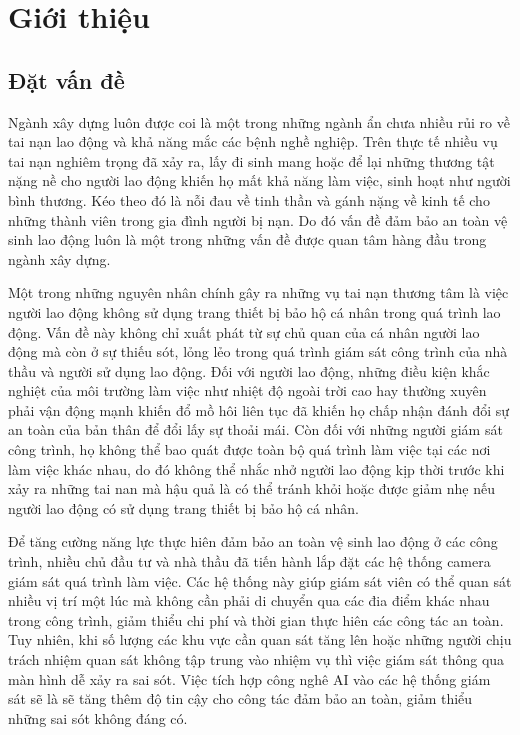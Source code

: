 \chapter{Giới thiệu}
\setcounter{page}{1}
\section{Đặt vấn đề}
Ngành xây dựng luôn được coi là một trong những ngành ẩn chưa nhiều rủi ro về tai nạn lao động 
và khả năng mắc các bệnh nghề nghiệp. Trên thực tế nhiều vụ tai nạn nghiêm trọng đã xảy ra, lấy đi 
sinh mang hoặc để lại những thương tật nặng nề cho người lao động khiến họ mất khả năng làm việc, 
sinh hoạt như người bình thương. Kéo theo đó là nỗi đau về tinh thần và gánh nặng về kinh tế 
cho những thành viên trong gia đình người bị nạn. Do đó vấn đề đảm bảo an toàn vệ sinh lao động 
luôn là một trong những vấn đề được quan tâm hàng đầu trong ngành xây dựng.

Một trong những nguyên nhân chính gây ra những vụ tai nạn thương tâm là việc người lao động không sử 
dụng trang thiết bị bảo hộ cá nhân trong quá trình lao động. Vấn đề này không chỉ xuất phát từ sự chủ 
quan của cá nhân người lao động mà còn ở sự thiếu sót, lỏng lẻo trong quá trình giám sát công trình của 
nhà thầu và người sử dụng lao động. Đối với người lao động, những điều kiện khắc nghiệt của môi trường 
làm việc như nhiệt độ ngoài trời cao hay thường xuyên phải vận động mạnh khiến đổ mồ hôi liên tục đã khiến họ chấp nhận đánh đổi sự an toàn của bản thân để đổi lấy sự thoải mái. Còn đối với những người giám sát công trình, họ không thể bao quát được toàn bộ quá trình làm việc tại các nơi làm việc khác 
nhau, do đó không thể nhắc nhở người lao động kịp thời trước khi xảy ra những tai nan mà hậu quả là có thể tránh khỏi hoặc được giảm nhẹ nếu người lao động có sử dụng trang thiết bị bảo hộ cá nhân.

Để tăng cường năng lực thực hiên đảm bảo an toàn vệ sinh lao động ở các công trình, nhiều chủ đầu tư và nhà thầu đã tiến hành lắp đặt các hệ thống camera giám sát quá trình làm việc. Các hệ thống này giúp giám sát viên có thể quan sát nhiều vị trí một lúc mà không cần phải di chuyển qua các đia điểm khác nhau trong công trình, giảm thiểu chi phí và thời gian thực hiên các công tác an toàn. Tuy nhiên, khi số lượng các khu vực cần quan sát tăng lên hoặc những người chịu trách nhiệm quan sát không tập trung vào nhiệm vụ  thì việc giám sát thông qua màn hình dễ xảy ra sai sót. Việc tích hợp công nghê AI vào các hệ thống giám sát sẽ là sẽ tăng thêm độ tin cậy cho công tác đảm bảo an toàn, giảm thiểu những sai sót không đáng có.

